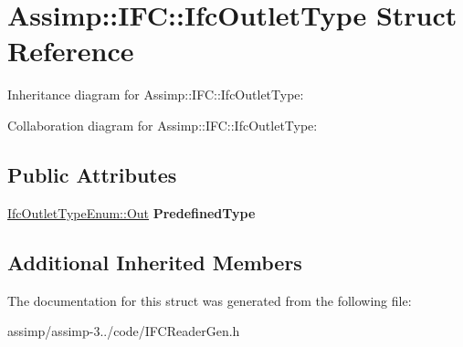 \hypertarget{struct_assimp_1_1_i_f_c_1_1_ifc_outlet_type}{\section{Assimp\+:\+:I\+F\+C\+:\+:Ifc\+Outlet\+Type Struct Reference}
\label{struct_assimp_1_1_i_f_c_1_1_ifc_outlet_type}
}


Inheritance diagram for Assimp\+:\+:I\+F\+C\+:\+:Ifc\+Outlet\+Type\+:


Collaboration diagram for Assimp\+:\+:I\+F\+C\+:\+:Ifc\+Outlet\+Type\+:
\subsection*{Public Attributes}
\begin{DoxyCompactItemize}
\item 
\hypertarget{struct_assimp_1_1_i_f_c_1_1_ifc_outlet_type_a09785a9283c21e22530418529b1e7ab0}{\hyperlink{classboost_1_1shared__ptr}{Ifc\+Outlet\+Type\+Enum\+::\+Out} {\bfseries Predefined\+Type}}\label{struct_assimp_1_1_i_f_c_1_1_ifc_outlet_type_a09785a9283c21e22530418529b1e7ab0}

\end{DoxyCompactItemize}
\subsection*{Additional Inherited Members}


The documentation for this struct was generated from the following file\+:\begin{DoxyCompactItemize}
\item 
assimp/assimp-\/3../code/I\+F\+C\+Reader\+Gen.\+h\end{DoxyCompactItemize}
